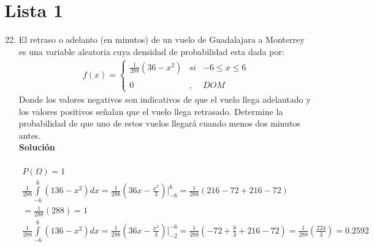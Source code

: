 \section{Lista 1}
\begin{enumerate}\setcounter{enumi}{21} %
    \item El retraso o adelanto (en minutos) de un vuelo de Guadalajara a Monterrey es una variable aleatoria cuya densidad de probabilidad esta dada por: \\
    \begin{align*}
    f(x)= \left\{ \begin{array}{lcc}
    \frac{1}{288}(36 - x^2) &   si  & -6 \leq x \leq 6 \\
    \\ 0 &  ,  & DOM
    \end{array}
    \right.
    \end{align*}
    Donde los valores negativos son indicativos de que el vuelo llega adelantado y los valores positivos señalan que el vuelo llega retrasado. Determine la probabilidad de que uno de estos vuelos llegará cuando menos dos minutos antes.
    \\\textbf{Solución}
    \\ \\
    \begin{gather*}
    P(\Omega) = 1 \\
    \frac{1}{288} \int \limits_{-6}^{6} (136-x^2) dx 
    = \frac{1}{288}(36x - \frac{x^3}{3})  \bigg\vert_{-6}^6 = \frac{1}{288}(216 - 72 + 216 - 72) \\		
    = \frac{1}{288}(288) = 1 \\
    \frac{1}{288} \int \limits_{-6}^{6} (136-x^2) dx 
    = \frac{1}{288}(36x - \frac{x^3}{3})  \bigg\vert_{-2}^{-6} = \frac{1}{288}(-72 + \frac{8}{3} + 216 - 72) = \frac{1}{288}(\frac{224}{3}) = 0.2592 \\
    \end{gather*}
    

\end{enumerate}

